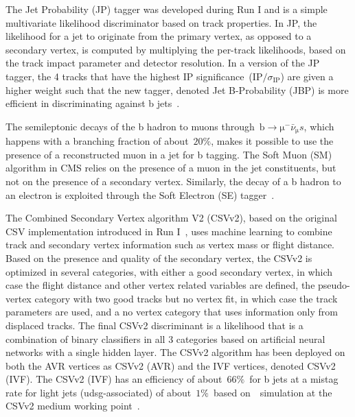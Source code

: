 The Jet Probability (JP) tagger was developed during Run I and is a simple multivariate likelihood discriminator based on track properties. In JP, the likelihood for a jet to originate from the primary vertex, as opposed to a secondary vertex, is computed by multiplying the per-track likelihoods, based on the track impact parameter and detector resolution. In a version of the JP tagger, the 4 tracks that have the highest IP significance~($\mathrm{IP} / \sigma_{\mathrm{IP}}$) are given a higher weight such that the new tagger, denoted Jet B-Probability (JBP) is more efficient in discriminating against b jets~\cite{Chatrchyan:2012jua}.

The semileptonic decays of the b hadron to muons through~$\mathrm{b} \rightarrow \mathrm{\mu}^- \bar{\nu}_{\mathrm{\mu}} s$, which happens with a branching fraction of about~$20\%$, makes it possible to use the presence of a reconstructed muon in a jet for b tagging. The Soft Muon (SM) algorithm in CMS relies on the presence of a muon in the jet constituents, but not on the presence of a secondary vertex. Similarly, the decay of a b hadron to an electron is exploited through the Soft Electron (SE) tagger~\cite{CMS-PAS-BTV-15-001}. 

The Combined Secondary Vertex algorithm V2 (CSVv2), based on the original CSV implementation introduced in Run I~\cite{Chatrchyan:2012jua}, uses machine learning to combine track and secondary vertex information such as vertex mass or flight distance. Based on the presence and quality of the secondary vertex, the CSVv2 is optimized in several categories, with either a good secondary vertex, in which case the flight distance and other vertex related variables are defined, the pseudo-vertex category with two good tracks but no vertex fit, in which case the track parameters are used, and a no vertex category that uses information only from displaced tracks. The final CSVv2 discriminant is a likelihood that is a combination of binary classifiers in all 3 categories based on artificial neural networks with a single hidden layer. The CSVv2 algorithm has been deployed on both the AVR vertices as CSVv2 (AVR) and the IVF vertices, denoted CSVv2 (IVF). The CSVv2 (IVF) has an efficiency of about~$66\%$~for b jets at a mistag rate for light jets (udsg-associated) of about~$1\%$~based on~\ttbar~simulation at the CSVv2 medium working point~\cite{CMS-PAS-BTV-15-001}.

